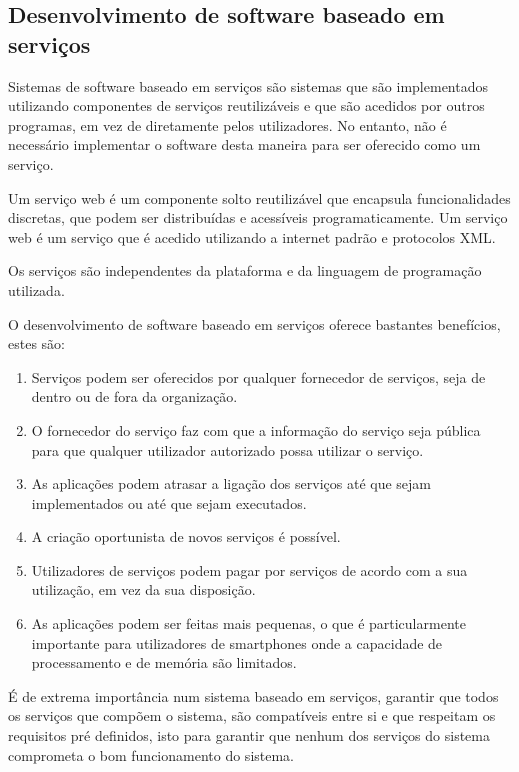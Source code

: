 \documentclass[runningheads]{llncs}
\begin{document}
\subsection{Desenvolvimento de software baseado em serviços}

Sistemas de software baseado em serviços são sistemas que são implementados utilizando componentes de serviços reutilizáveis e que são acedidos por outros programas, em vez de diretamente pelos utilizadores. No entanto, não é necessário implementar o software desta maneira para ser oferecido como um serviço.\par
Um serviço web é um componente solto reutilizável que encapsula funcionalidades discretas, que podem ser distribuídas e acessíveis programaticamente. Um serviço web é um serviço que é acedido utilizando a internet padrão e protocolos XML. \par
Os serviços são independentes da plataforma e da linguagem de programação utilizada.\par
O desenvolvimento de software baseado em serviços oferece bastantes benefícios, estes são:

\begin{enumerate}
    \item Serviços podem ser oferecidos por qualquer fornecedor de serviços, seja de dentro ou de fora da organização.
    \item O fornecedor do serviço faz com que a informação do serviço seja pública para que qualquer utilizador autorizado possa utilizar o serviço.
    \item As aplicações podem atrasar a ligação dos serviços até que sejam implementados ou até que sejam executados.
    \item A criação oportunista de novos serviços é possível.
    \item Utilizadores de serviços podem pagar por serviços de acordo com a sua utilização, em vez da sua disposição.
    \item As aplicações podem ser feitas mais pequenas, o que é particularmente importante para utilizadores de smartphones onde a capacidade de processamento e de memória são limitados.
  \end{enumerate}
  
  É de extrema importância num sistema baseado em serviços, garantir que todos os serviços que compõem o sistema, são compatíveis entre si e que respeitam os requisitos pré definidos, isto para garantir que nenhum dos serviços do sistema comprometa o bom funcionamento do sistema.
\end{document}
